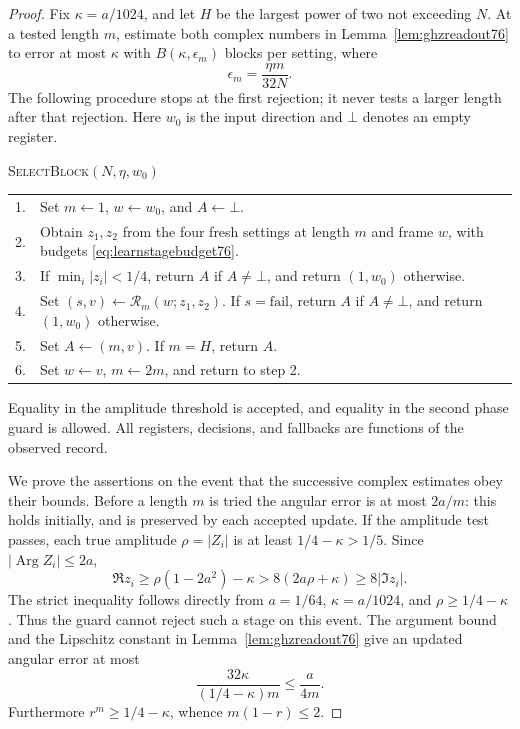 \begin{proof}
Fix $\kappa=a/1024$, and let $H$ be the largest power of two not
exceeding $N$.  At a tested length $m$, estimate both complex
numbers in Lemma~\ref{lem:ghzreadout76} to error at most $\kappa$
with $B(\kappa,\epsilon_m)$ blocks per setting, where
\begin{equation}\label{eq:learnstagebudget76}
 \epsilon_m=\frac{\eta m}{32N}.
\end{equation}
The following procedure stops at the first rejection; it never
tests a larger length after that rejection.  Here $w_0$ is the input
direction and $\bot$ denotes an empty register.
\begin{center}
\begin{minipage}{.96\linewidth}
\small
\textsc{SelectBlock}$(N,\eta,w_0)$\par
\begin{tabular}{@{}r@{\quad}p{.88\linewidth}@{}}
1.& Set $m\gets1$, $w\gets w_0$, and $A\gets\bot$.\\
2.& Obtain $z_1,z_2$ from the four fresh settings at length $m$
     and frame $w$, with budgets \eqref{eq:learnstagebudget76}.\\
3.& If $\min_i|z_i|<1/4$, return $A$ if $A\ne\bot$, and
     return $(1,w_0)$ otherwise.\\
4.& Set $(s,v)\gets\mathcal R_m(w;z_1,z_2)$.  If
     $s=\mathrm{fail}$, return $A$ if $A\ne\bot$, and return
     $(1,w_0)$ otherwise.\\
5.& Set $A\gets(m,v)$.  If $m=H$, return $A$.\\
6.& Set $w\gets v$, $m\gets2m$, and return to step 2.
\end{tabular}
\end{minipage}
\end{center}
Equality in the amplitude threshold is accepted, and equality in
the second phase guard is allowed.  All registers, decisions, and
fallbacks are functions of the observed record.

We prove the assertions on the event that the successive complex
estimates obey their bounds.  Before a length $m$ is tried the
angular error is at most $2a/m$: this holds initially, and is
preserved by each accepted update.  If the amplitude test passes,
each true amplitude $\rho=|Z_i|$ is at least $1/4-\kappa>1/5$.
Since $|\operatorname{Arg}Z_i|\le2a$,
\[
 \Re z_i\ge\rho(1-2a^2)-\kappa
       >8(2a\rho+\kappa)\ge8|\Im z_i|.
\]
The strict inequality follows directly from $a=1/64$,
$\kappa=a/1024$, and $\rho\ge1/4-\kappa$.  Thus the guard
cannot reject such a stage on this event.  The argument bound and
the Lipschitz constant in Lemma~\ref{lem:ghzreadout76} give an
updated angular error at most
\[
 \frac{32\kappa}{(1/4-\kappa)m}\le\frac{a}{4m}.
\]
Furthermore $r^m\ge1/4-\kappa$, whence $m(1-r)\le2$.


\end{proof}
